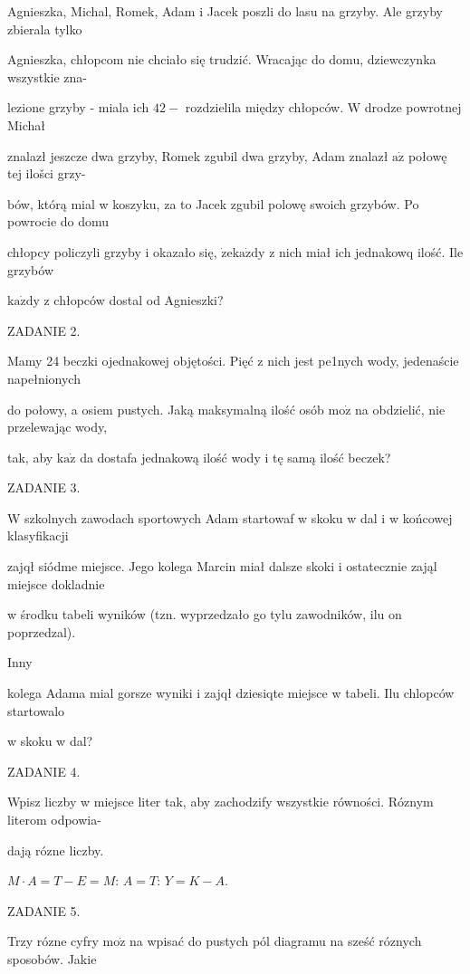 \documentclass[a4paper,12pt]{article}
\begin{document}
Agnieszka, Michal, Romek, Adam i Jacek poszli do lasu na grzyby. Ale grzyby zbierala tylko

Agnieszka, chłopcom nie chciało się trudzić. Wracając do domu, dziewczynka wszystkie zna-

lezione grzyby - miala ich $42 -$ rozdzielila między chłopców. $\mathrm{W}$ drodze powrotnej Michał

znalazł jeszcze dwa grzyby, Romek zgubil dwa grzyby, Adam znalazł $\mathrm{a}\dot{\mathrm{z}}$ połowę tej ilošci grzy-

bów, którą mial w koszyku, za to Jacek zgubil polowę swoich grzybów. Po powrocie do domu

chłopcy policzyli grzyby i okazało się, $\dot{\mathrm{z}}\mathrm{e}\mathrm{k}\mathrm{a}\dot{\mathrm{z}}\mathrm{d}\mathrm{y}$ z nich miał ich jednakowq ilość. Ile grzybów

$\mathrm{k}\mathrm{a}\dot{\mathrm{z}}\mathrm{d}\mathrm{y}$ z chłopców dostal od Agnieszki?

ZADANIE 2.

Mamy 24 beczki ojednakowej objętości. Pięć z nich jest pe1nych wody, jedenaście napełnionych

do połowy, a osiem pustych. Jaką maksymalną ilość osób $\mathrm{m}\mathrm{o}\dot{\mathrm{z}}$ na obdzielić, nie przelewając wody,

tak, aby $\mathrm{k}\mathrm{a}\dot{\mathrm{z}}$ da dostafa jednakową ilość wody i tę samą ilość beczek?

ZADANIE 3.

W szkolnych zawodach sportowych Adam startowaf w skoku w dal i w końcowej klasyfikacji

zajqł siódme miejsce. Jego kolega Marcin miał dalsze skoki i ostatecznie zająl miejsce dokladnie

w środku tabeli wyników (tzn. wyprzedzało go tylu zawodników, ilu on poprzedzal).

Inny

kolega Adama mial gorsze wyniki i zajqł dziesiqte miejsce w tabeli. Ilu chlopców startowalo

w skoku w dal?

ZADANIE 4.

Wpisz liczby w miejsce liter tak, aby zachodzify wszystkie równości. Róznym literom odpowia-

dają rózne liczby.

$M\cdot A=T-E=M$: $A=T$: $Y=K-A.$

ZADANIE 5.

Trzy rózne cyfry $\mathrm{m}\mathrm{o}\dot{\mathrm{z}}$ na wpisać do pustych pól diagramu na sześć róznych sposobów. Jakie
\end{document}
